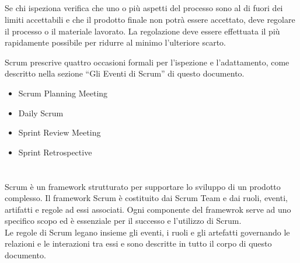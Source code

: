 \subsection*{\color{SteelBlue}{Adattamento}}
\label{sec:adaptation}
Se chi  ispeziona verifica che uno o pi\`u aspetti del processo sono al di fuori dei limiti accettabili  e che il prodotto finale non
potr\`a essere accettato, deve regolare il processo o il materiale lavorato.  La regolazione  deve essere  effettuata il  pi\`u rapidamente
possibile per ridurre al minimo l'ulteriore scarto.

Scrum prescrive quattro occasioni formali per l'ispezione e l'adattamento, come descritto nella sezione ``Gli Eventi di Scrum'' di questo 
documento.
\begin{itemize}
\item Scrum Planning Meeting
\item Daily Scrum
\item Sprint Review Meeting
\item Sprint Retrospective
\end{itemize}


\section*{\color{Blue}{Scrum}}%
\label{sec:scrum}
Scrum \`e un framework strutturato per supportare lo sviluppo di un prodotto complesso. Il framework Scrum \`e costituito dai Scrum Team e 
dai ruoli, eventi, artifatti e regole ad essi associati. Ogni componente del framewrok serve ad uno specifico scopo ed \`e essenziale per il 
successo e l'utilizzo di Scrum.
\newline
\\ Le regole di Scrum legano insieme gli eventi, i ruoli e gli artefatti governando le relazioni e le interazioni tra essi e sono descritte 
in tutto il corpo di questo documento.
